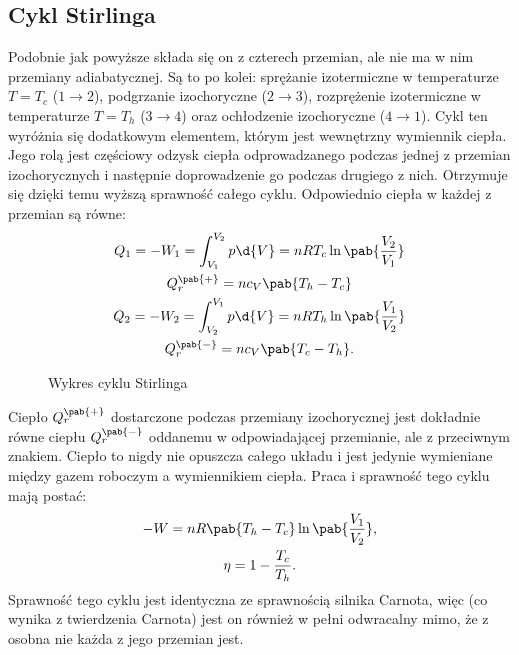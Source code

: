 \subsection{Cykl Stirlinga}
Podobnie jak powyższe składa się on z czterech przemian, ale nie ma w nim przemiany adiabatycznej. Są to po kolei: sprężanie izotermiczne w temperaturze \(T = T_c\) (\(1 \rightarrow 2\)), podgrzanie izochoryczne (\(2 \rightarrow 3\)), rozprężenie izotermiczne w temperaturze \(T = T_h\) (\(3 \rightarrow 4\)) oraz ochłodzenie izochoryczne (\(4 \rightarrow 1\)). Cykl ten wyróżnia się dodatkowym elementem, którym jest wewnętrzny wymiennik ciepła. Jego rolą jest częściowy odzysk ciepła odprowadzanego podczas jednej z przemian izochorycznych i następnie doprowadzenie go podczas drugiego z nich. Otrzymuje się dzięki temu wyższą sprawność całego cyklu. Odpowiednio ciepła w każdej z przemian są równe:
\begin{gather*}
	Q_1 = - W_1     = \int_{V_1}^{V_2} p \d{V} = nRT_c \ln\pab{\frac{V_2}{V_1}} \\
	Q_{r}^{\pab{+}} = n c_V \pab{T_h - T_c} \\
	Q_2 = - W_2     = \int_{V_2}^{V_1} p \d{V} = nRT_h \ln\pab{\frac{V_1}{V_2}} \\
	Q_{r}^{\pab{-}} = n c_V \pab{T_c - T_h}.
\end{gather*}

\begin{figure}
	\centering
	
	\caption{Wykres cyklu Stirlinga}
	\label{fig:pv_silnik_stirling}
\end{figure}

Ciepło \(Q_{r}^{\pab{+}}\) dostarczone podczas przemiany izochorycznej jest dokładnie równe ciepłu \(Q_{r}^{\pab{-}}\) oddanemu w odpowiadającej przemianie, ale z przeciwnym znakiem. Ciepło to nigdy nie opuszcza całego układu i jest jedynie wymieniane między gazem roboczym a wymiennikiem ciepła. Praca i sprawność tego cyklu mają postać:
\begin{gather*}
	- W = n R \pab{T_h - T_c} \ln\pab{\frac{V_1}{V_2}}, \\
	\eta = 1 - \frac{T_c}{T_h}.
\end{gather*}
Sprawność tego cyklu jest identyczna ze sprawnością silnika Carnota, więc (co wynika z twierdzenia Carnota) jest on również w pełni odwracalny mimo, że z osobna nie każda z jego przemian jest.